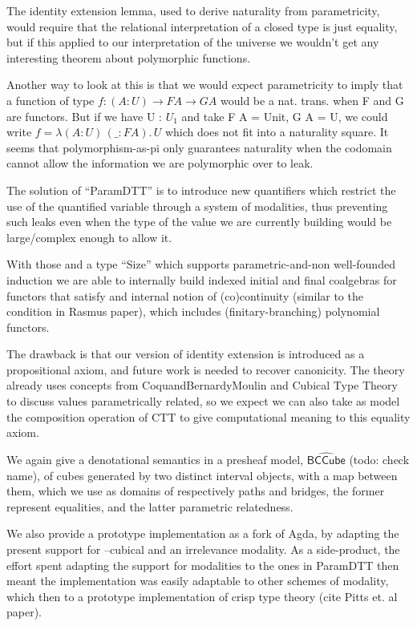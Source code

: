 \documentclass{book}
\newcommand{\sd}{.\,}
\begin{document}
\begin{itemize}
\begin{itemize}
    The identity extension lemma, used to derive naturality from
    parametricity, would require that the relational interpretation of
    a closed type is just equality, but if this applied to our
    interpretation of the universe we wouldn't get any interesting
    theorem about polymorphic functions.

    Another way to look at this is that we would expect parametricity
    to imply that a function of type $f : (A : U) \to F A \to G A$
    would be a nat. trans. when F and G are functors.  But if we have
    U : $U_1$ and take F A = Unit, G A = U, we could write
    $f = \lambda (A : U)\, (\_ : F A)\sd U$ which does not fit into a naturality square.
    It seems that polymorphism-as-pi only guarantees naturality when
    the codomain cannot allow the information we are polymorphic over
    to leak.

    The solution of ``ParamDTT'' is to introduce new quantifiers which
    restrict the use of the quantified variable through a system of
    modalities, thus preventing such leaks even when the type of the
    value we are currently building would be large/complex enough to
    allow it.

    With those and a type ``Size'' which supports parametric-and-non
    well-founded induction we are able to internally build indexed
    initial and final coalgebras for functors that satisfy and
    internal notion of (co)continuity (similar to the condition in
    Rasmus paper), which includes (finitary-branching) polynomial
    functors.

    The drawback is that our version of identity extension is
    introduced as a propositional axiom, and future work is needed to
    recover canonicity. The theory already uses concepts from
    CoquandBernardyMoulin and Cubical Type Theory to discuss values
    parametrically related, so we expect we can also take as model the
    composition operation of CTT to give computational meaning to this
    equality axiom.

    We again give a denotational semantics in a presheaf model,
    $\hat{\mathsf{BCCube}}$ (todo: check name), of cubes generated by two distinct interval
    objects, with a map between them, which we use as domains of
    respectively paths and bridges, the former represent equalities,
    and the latter parametric relatedness.

    We also provide a prototype implementation as a fork of Agda, by
    adapting the present support for --cubical and an irrelevance
    modality. As a side-product, the effort spent adapting the support
    for modalities to the ones in ParamDTT then meant the
    implementation was easily adaptable to other schemes of modality,
    which then to a prototype implementation of crisp type theory
    (cite Pitts et. al paper).
    \end{itemize}


\end{itemize}
\end{document}
